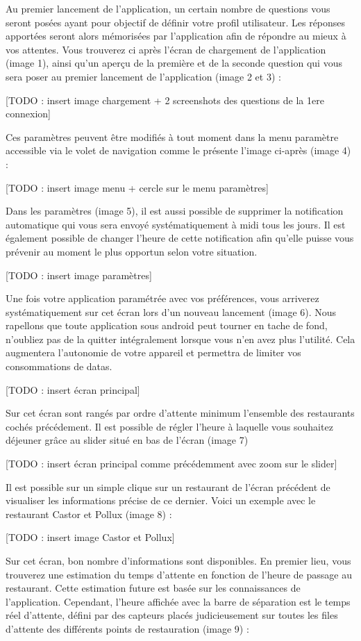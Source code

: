 Au premier lancement de l’application, un certain nombre de questions vous
seront posées ayant pour objectif de définir votre profil utilisateur. Les 
réponses apportées seront alors mémorisées par l’application afin de
répondre au mieux à vos attentes. Vous trouverez ci après l’écran de
chargement de l’application (image 1), ainsi qu’un aperçu de la première
et de la seconde question qui vous sera poser au premier lancement de
l’application (image 2 et 3) : 

[TODO : insert image chargement + 2 screenshots des questions de la 1ere connexion]

Ces paramètres peuvent être modifiés à tout moment dans la menu paramètre
accessible via le volet de navigation comme le présente l’image ci-après (image 4) : 

[TODO : insert image menu + cercle sur le menu paramètres]

Dans les paramètres (image 5), il est aussi possible de supprimer la notification
automatique qui vous sera envoyé systématiquement à midi tous les jours. Il est
également possible de changer l’heure de cette notification afin qu’elle puisse vous
prévenir au moment le plus opportun selon votre situation. 

[TODO : insert image paramètres] 

Une fois votre application paramétrée avec vos préférences, vous arriverez
systématiquement sur cet écran lors d’un nouveau lancement (image 6). Nous
rapellons que toute application sous android peut tourner en tache de fond,
n’oubliez pas de la quitter intégralement lorsque vous n’en avez plus l’utilité.
Cela augmentera l’autonomie de votre appareil et permettra de limiter vos
consommations de datas. 

[TODO : insert écran principal]

Sur cet écran sont rangés par ordre d’attente minimum l’ensemble des
restaurants cochés précédement. Il est possible de régler l’heure à laquelle
vous souhaitez déjeuner grâce au slider situé en bas de l’écran (image 7)

[TODO : insert écran principal comme précédemment avec zoom sur le slider]

Il est possible sur un simple clique sur un restaurant de l’écran précédent de
visualiser les informations précise de ce dernier. Voici un exemple avec le
restaurant Castor et Pollux (image 8) : 

[TODO : insert image Castor et Pollux]

Sur cet écran, bon nombre d’informations sont disponibles. En premier lieu,
vous trouverez une estimation du temps d’attente en fonction de l’heure de
passage au restaurant. Cette estimation future est basée sur les connaissances
de l’application. Cependant, l’heure affichée avec la barre de séparation est le
temps réel d’attente, défini par des capteurs placés judicieusement sur toutes
les files d’attente des différents points de restauration (image 9) : 

